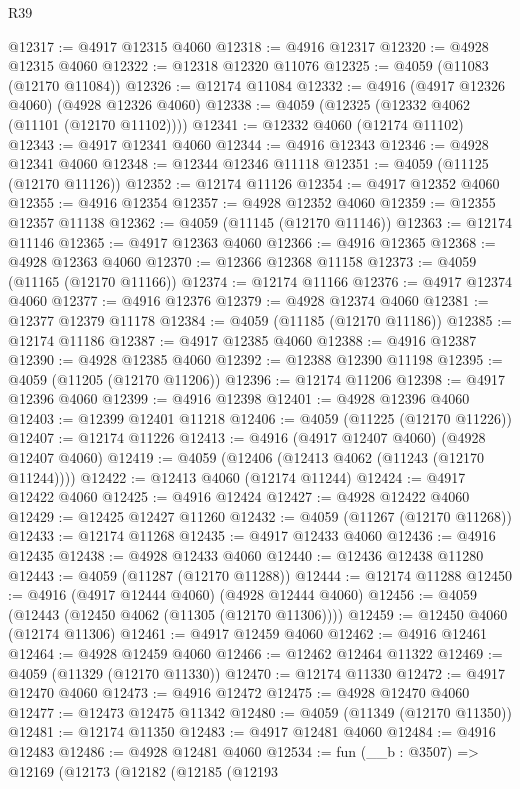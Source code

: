 \begin{lexlean}{R39}
\begin{coremodule}
@12317 := @4917 @12315 @4060
@12318 := @4916 @12317
@12320 := @4928 @12315 @4060
@12322 := @12318 @12320 @11076
@12325 := @4059 (@11083 (@12170 @11084))
@12326 := @12174 @11084
@12332 := @4916 (@4917 @12326 @4060) (@4928 @12326 @4060)
@12338 := @4059 (@12325 (@12332 @4062 (@11101 (@12170 @11102))))
@12341 := @12332 @4060 (@12174 @11102)
@12343 := @4917 @12341 @4060
@12344 := @4916 @12343
@12346 := @4928 @12341 @4060
@12348 := @12344 @12346 @11118
@12351 := @4059 (@11125 (@12170 @11126))
@12352 := @12174 @11126
@12354 := @4917 @12352 @4060
@12355 := @4916 @12354
@12357 := @4928 @12352 @4060
@12359 := @12355 @12357 @11138
@12362 := @4059 (@11145 (@12170 @11146))
@12363 := @12174 @11146
@12365 := @4917 @12363 @4060
@12366 := @4916 @12365
@12368 := @4928 @12363 @4060
@12370 := @12366 @12368 @11158
@12373 := @4059 (@11165 (@12170 @11166))
@12374 := @12174 @11166
@12376 := @4917 @12374 @4060
@12377 := @4916 @12376
@12379 := @4928 @12374 @4060
@12381 := @12377 @12379 @11178
@12384 := @4059 (@11185 (@12170 @11186))
@12385 := @12174 @11186
@12387 := @4917 @12385 @4060
@12388 := @4916 @12387
@12390 := @4928 @12385 @4060
@12392 := @12388 @12390 @11198
@12395 := @4059 (@11205 (@12170 @11206))
@12396 := @12174 @11206
@12398 := @4917 @12396 @4060
@12399 := @4916 @12398
@12401 := @4928 @12396 @4060
@12403 := @12399 @12401 @11218
@12406 := @4059 (@11225 (@12170 @11226))
@12407 := @12174 @11226
@12413 := @4916 (@4917 @12407 @4060) (@4928 @12407 @4060)
@12419 := @4059 (@12406 (@12413 @4062 (@11243 (@12170 @11244))))
@12422 := @12413 @4060 (@12174 @11244)
@12424 := @4917 @12422 @4060
@12425 := @4916 @12424
@12427 := @4928 @12422 @4060
@12429 := @12425 @12427 @11260
@12432 := @4059 (@11267 (@12170 @11268))
@12433 := @12174 @11268
@12435 := @4917 @12433 @4060
@12436 := @4916 @12435
@12438 := @4928 @12433 @4060
@12440 := @12436 @12438 @11280
@12443 := @4059 (@11287 (@12170 @11288))
@12444 := @12174 @11288
@12450 := @4916 (@4917 @12444 @4060) (@4928 @12444 @4060)
@12456 := @4059 (@12443 (@12450 @4062 (@11305 (@12170 @11306))))
@12459 := @12450 @4060 (@12174 @11306)
@12461 := @4917 @12459 @4060
@12462 := @4916 @12461
@12464 := @4928 @12459 @4060
@12466 := @12462 @12464 @11322
@12469 := @4059 (@11329 (@12170 @11330))
@12470 := @12174 @11330
@12472 := @4917 @12470 @4060
@12473 := @4916 @12472
@12475 := @4928 @12470 @4060
@12477 := @12473 @12475 @11342
@12480 := @4059 (@11349 (@12170 @11350))
@12481 := @12174 @11350
@12483 := @4917 @12481 @4060
@12484 := @4916 @12483
@12486 := @4928 @12481 @4060
@12534 := fun (__b : @3507) =>
  @12169
    (@12173
      (@12182
        (@12185
          (@12193

\end{coremodule}
\end{lexlean}
